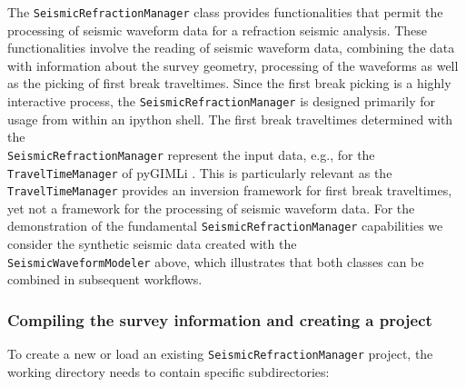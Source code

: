 \documentclass[a4paper,fleqn]{cas-sc}
\begin{document}
The \texttt{SeismicRefractionManager} class provides functionalities that permit the processing of seismic waveform data for a refraction seismic analysis. These functionalities involve the reading of seismic waveform data, combining the data with information about the survey geometry, processing of the waveforms as well as the picking of first break traveltimes. Since the first break picking is a highly interactive process, the \texttt{SeismicRefractionManager} is designed primarily for usage from within an ipython shell. The first break traveltimes determined with the\\ \texttt{SeismicRefractionManager} represent the input data, e.g., for the \texttt{TravelTimeManager} of pyGIMLi \citep{ruecker2017}. This is particularly relevant as the \texttt{TravelTimeManager} provides an inversion framework for first break traveltimes, yet not a framework for the processing of seismic waveform data.
For the demonstration of the fundamental \texttt{SeismicRefractionManager} capabilities we consider the synthetic seismic data created with the\\ \texttt{SeismicWaveformModeler} above, which illustrates that both classes can be combined in subsequent workflows. 

\subsubsection{Compiling the survey information and creating a project}

To create a new or load an existing \texttt{SeismicRefractionManager} project, the working directory needs to contain specific subdirectories:
\end{document}
